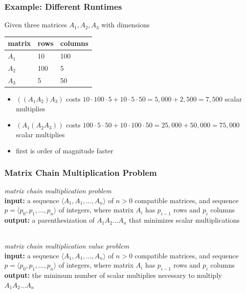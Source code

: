 \documentclass{beamer}
\newcommand{\stanza}{ \\~\ }
\begin{document}
\begin{frame} \frametitle{Example: Different Runtimes}
Given three matrices $A_1, A_2, A_3$ with dimensions
\begin{center}
  \begin{tabular}{l|ll}
    matrix & rows & columns \\ \hline
    $A_1$ & 10 & 100 \\
    $A_2$ & 100 & 5 \\
    $A_3$ & 5 & 50
  \end{tabular}
\end{center}
\begin{itemize}
  \item $((A_1 A_2)A_3)$ costs $10 \cdot 100 \cdot 5 + 10 \cdot 5 \cdot 50= 5,000+2,500 = 7,500$ scalar multiplies
  \item $(A_1 (A_2 A_3))$ costs $100 \cdot 5 \cdot 50 + 10 \cdot 100 \cdot 50 = 25,000 + 50,000 = 75,000$ scalar multiplies
  \item first is order of magnitude faster
\end{itemize}
\end{frame}

\begin{frame} \frametitle{Matrix Chain Multiplication Problem}
  \emph{matrix chain multiplication problem} \\
  \textbf{input:} a sequence $\langle A_1, A_1, \ldots, A_n \rangle$ of $n>0$ compatible matrices,
    and sequence $p=\langle p_0, p_1, \ldots, p_n \rangle$ of integers, where
    matrix $A_i$ has $p_{i-1}$ rows and $p_i$ columns \\
  \textbf{output:} a parenthesization of $A_1 A_2 \ldots A_n$ that minimizes scalar multiplications
  \stanza

  \emph{matrix chain multiplication value problem} \\
  \textbf{input:} a sequence $\langle A_1, A_1, \ldots, A_n \rangle$ of $n>0$ compatible matrices,
    and sequence $p=\langle p_0, p_1, \ldots, p_n \rangle$ of integers, where
    matrix $A_i$ has $p_{i-1}$ rows and $p_i$ columns \\
  \textbf{output:} the minimum number of scalar multiplies necessary to multiply $A_1 A_2 \ldots A_n$ 
\end{frame}
\end{document}
